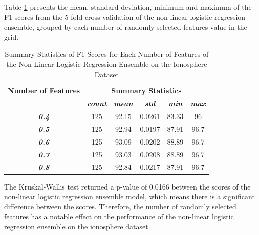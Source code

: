 \documentclass[10pt, conference]{IEEEtran}
\begin{document}
Table \ref{table: I_feature_nonlinear_performance_metrics} presents the mean, standard deviation, minimum and maximum of the
F1-scores from the 5-fold cross-validation of the non-linear logistic regression ensemble, grouped by each number of randomly selected
features value in the grid.
\begin{table}[H]
    \caption{Summary Statistics of F1-Scores for Each Number of Features of the Non-Linear Logistic Regression Ensemble on the Ionosphere Dataset}
    \begin{center}
        \begin{tabular}{|c||c|c|c|c|c|}
            \hline
            \textbf{Number of Features}&\multicolumn{5}{|c|}{\textbf{Summary Statistics}} \\
            \cline{2-6}
                                &\textbf{\textit{count}} & \textbf{\textit{mean}} & \textbf{\textit{std}} & \textbf{\textit{min}} & \textbf{\textit{max}}\\
            \hline
            \textbf{\textit{0.4}} & 125 & 92.15 & 0.0261 & 83.33 & 96 \\
            \textbf{\textit{0.5}} & 125 & 92.94 & 0.0197 & 87.91 & 96.7 \\
            \textbf{\textit{0.6}} & 125 & 93.09 & 0.0202 & 88.89 & 96.7 \\
            \textbf{\textit{0.7}} & 125 & 93.03 & 0.0208 & 88.89 & 96.7 \\
            \textbf{\textit{0.8}} & 125 & 92.84 & 0.0217 & 87.91 & 96.7 \\
            \hline
        \end{tabular}
    \end{center}
    \label{table: I_feature_nonlinear_performance_metrics}
\end{table}
The Kruskal-Wallis test returned a p-value of 0.0166 between the scores of the non-linear logistic regression ensemble model,
which means there is a significant difference between the scores. Therefore, the number of randomly selected
features has a notable effect on the performance of the non-linear logistic regression ensemble on the ionosphere dataset.
\end{document}

